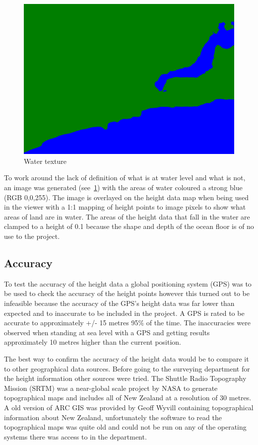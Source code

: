 \documentclass[12pt]{report}
\begin{document}
\begin{figure}
\includegraphics[scale=0.4]{terrain.png}
\caption{Water texture}
\label{overlaytexture}
\end{figure}
To work around the lack of definition of what is at water level and what is not, an image was generated (see~\ref{overlaytexture}) with the areas of water coloured a strong blue (RGB 0,0,255). The image is overlayed on the height data map when being used in the viewer with a 1:1 mapping of height points to image pixels to show what areas of land are in water. The areas of the height data that fall in the water are clamped to a height of 0.1 because the shape and depth of the ocean floor is of no use to the project.


\subsection{Accuracy}
To test the accuracy of the height data a global positioning system (GPS) was to be used to check the accuracy of the height points however this turned out to be infeasible because the accuracy of the GPS's height data was far lower than expected and to inaccurate to be included in the project. A GPS is rated to be accurate to approximately +/- 15 metres 95\% of the time\cite{gpsaltitude}. The inaccuracies were observed when standing at sea level with a GPS and getting results approximately 10 metres higher than the current position.

The best way to confirm the accuracy of the height data would be to compare it to other geographical data sources. Before going to the surveying department for the height information other sources were tried. The Shuttle Radio Topography Mission (SRTM)\cite{srtm} was a near-global scale project by NASA to generate topographical maps and includes all of New Zealand at a resolution of 30 metres. A old version of ARC GIS was provided by Geoff Wyvill containing topographical information about New Zealand, unfortunately the software to read the topographical maps was quite old and could not be run on any of the operating systems there was access to in the department.
\end{document}
